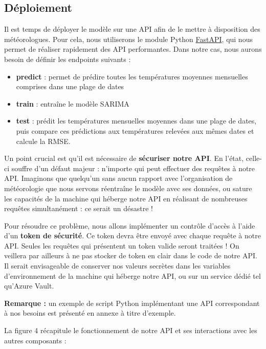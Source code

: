 \documentclass[french]{article}
\begin{document}
    \subsection{Déploiement}

    Il est temps de déployer le modèle sur une API afin de le mettre à disposition des météorologues. Pour cela, nous utiliserons le module Python \href{https://fastapi.tiangolo.com/}{FastAPI}, qui nous permet de réaliser rapidement des API performantes.
    Dans notre cas, nous aurons besoin de définir les endpoints suivants :
    \begin{itemize}
        \item \textbf{predict} : permet de prédire toutes les températures moyennes mensuelles comprises dans une plage de dates
        \item \textbf{train} : entraîne le modèle SARIMA
        \item \textbf{test} : prédit les températures mensuelles moyennes dans une plage de dates, puis compare ces prédictions aux températures relevées aux mêmes dates et calcule la RMSE.
    \end{itemize}

    Un point crucial est qu'il est nécessaire de \textbf{sécuriser notre API}. En l'état, celle-ci souffre d'un défaut majeur : n'importe qui peut effectuer des requêtes à notre API. Imaginons que quelqu'un sans aucun rapport avec l'organisation de météorologie que nous servons réentraîne le modèle avec ses données, ou sature les capacités de la machine qui héberge notre API en réalisant de nombreuses requêtes simultanément : ce serait un désastre !

    Pour résoudre ce problème, nous allons implémenter un contrôle d'accès à l'aide d'un \textbf{token de sécurité}. Ce token devra être envoyé avec chaque requête à notre API. Seules les requêtes qui présentent un token valide seront traitées ! On veillera par ailleurs à ne pas stocker de token en clair dans le code de notre API. Il serait envisageable de conserver nos valeurs secrètes dans les variables d'environnement de la machine qui héberge notre API, ou sur un service dédié tel qu'Azure Vault. 


    \textbf{Remarque : }un exemple de script Python implémentant une API correspondant à nos besoins est présenté en annexe à titre d'exemple.


    La figure 4 récapitule le fonctionnement de notre API et ses interactions avec les autres composants :
\end{document}

